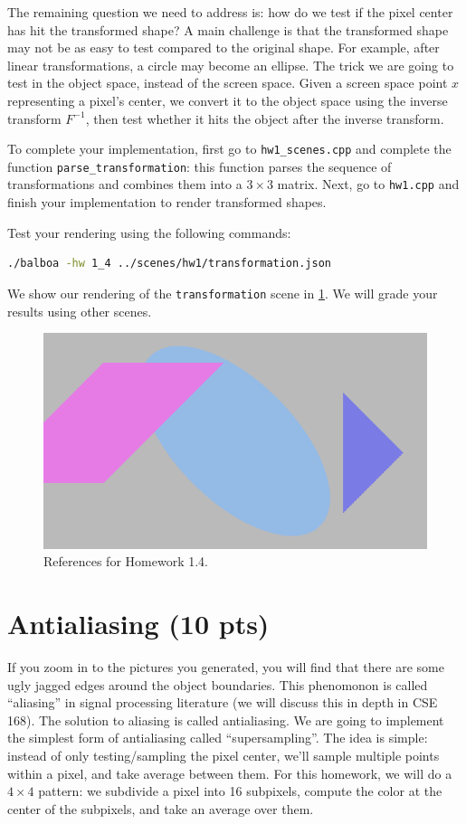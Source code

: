 The remaining question we need to address is: how do we test if the pixel center has hit the transformed shape? A main challenge is that the transformed shape may not be as easy to test compared to the original shape. For example, after linear transformations, a circle may become an ellipse. The trick we are going to test in the object space, instead of the screen space. Given a screen space point $x$ representing a pixel's center, we convert it to the object space using the inverse transform $F^{-1}$, then test whether it hits the object after the inverse transform. 

To complete your implementation, first go to \lstinline{hw1_scenes.cpp} and complete the function \lstinline{parse_transformation}: this function parses the sequence of transformations and combines them into a $3 \times 3$ matrix. Next, go to \lstinline{hw1.cpp} and finish your implementation to render transformed shapes.

Test your rendering using the following commands:
\begin{lstlisting}[language=bash]
  ./balboa -hw 1_4 ../scenes/hw1/transformation.json
\end{lstlisting}

We show our rendering of the \lstinline{transformation} scene in \cref{fig:hw1_4}. We will grade your results using other scenes.

\begin{figure}[ht]
    \centering
    \includegraphics[width=0.5\linewidth]{imgs/hw_1_4.png}
    \caption{References for Homework 1.4.}
    \label{fig:hw1_4}
\end{figure}

\section{Antialiasing (10 pts)}
If you zoom in to the pictures you generated, you will find that there are some ugly jagged edges around the object boundaries. This phenomonon is called ``aliasing'' in signal processing literature (we will discuss this in depth in CSE 168). The solution to aliasing is called antialiasing. We are going to implement the simplest form of antialiasing called ``supersampling''. The idea is simple: instead of only testing/sampling the pixel center, we'll sample multiple points within a pixel, and take average between them. For this homework, we will do a $4\times4$ pattern: we subdivide a pixel into 16 subpixels, compute the color at the center of the subpixels, and take an average over them.


